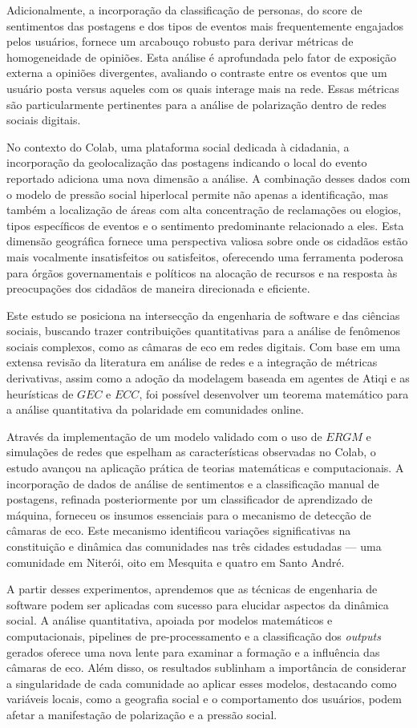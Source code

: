 Adicionalmente, a incorporação da classificação de personas, do score de sentimentos das postagens e dos tipos de eventos mais frequentemente engajados pelos usuários, fornece um arcabouço robusto para derivar métricas de homogeneidade de opiniões. Esta análise é aprofundada pelo fator de exposição externa a opiniões divergentes, avaliando o contraste entre os eventos que um usuário posta versus aqueles com os quais interage mais na rede. Essas métricas são particularmente pertinentes para a análise de polarização dentro de redes sociais digitais.

No contexto do Colab, uma plataforma social dedicada à cidadania, a incorporação da geolocalização das postagens indicando o local do evento reportado adiciona uma nova dimensão a análise. A combinação desses dados com o modelo de pressão social hiperlocal permite não apenas a identificação, mas também a localização de áreas com alta concentração de reclamações ou elogios, tipos específicos de eventos e o sentimento predominante relacionado a eles. Esta dimensão geográfica fornece uma perspectiva valiosa sobre onde os cidadãos estão mais vocalmente insatisfeitos ou satisfeitos, oferecendo uma ferramenta poderosa para órgãos governamentais e políticos na alocação de recursos e na resposta às preocupações dos cidadãos de maneira direcionada e eficiente.

Este estudo se posiciona na intersecção da engenharia de software e das ciências sociais, buscando trazer contribuições quantitativas para a análise de fenômenos sociais complexos, como as câmaras de eco em redes digitais. Com base em uma extensa revisão da literatura em análise de redes e a integração de métricas derivativas, assim como a adoção da modelagem baseada em agentes de Atiqi e as heurísticas de $GEC$ e $ECC$, foi possível desenvolver um teorema matemático para a análise quantitativa da polaridade em comunidades online.

Através da implementação de um modelo validado com o uso de $ERGM$ e simulações de redes que espelham as características observadas no Colab, o estudo avançou na aplicação prática de teorias matemáticas e computacionais. A incorporação de dados de análise de sentimentos e a classificação manual de postagens, refinada posteriormente por um classificador de aprendizado de máquina, forneceu os insumos essenciais para o mecanismo de detecção de câmaras de eco. Este mecanismo identificou variações significativas na constituição e dinâmica das comunidades nas três cidades estudadas — uma comunidade em Niterói, oito em Mesquita e quatro em Santo André.

A partir desses experimentos, aprendemos que as técnicas de engenharia de software podem ser aplicadas com sucesso para elucidar aspectos da dinâmica social. A análise quantitativa, apoiada por modelos matemáticos e computacionais, pipelines de pre-processamento e a classificação dos \textit{outputs} gerados oferece uma nova lente para examinar a formação e a influência das câmaras de eco. Além disso, os resultados sublinham a importância de considerar a singularidade de cada comunidade ao aplicar esses modelos, destacando como variáveis locais, como a geografia social e o comportamento dos usuários, podem afetar a manifestação de polarização e a pressão social.